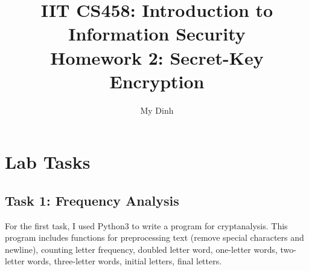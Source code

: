 \documentclass{article}
\title{IIT CS458: Introduction to Information Security\\
  {\large Homework 2: Secret-Key Encryption}}
\author{My Dinh}
\date{}
\begin{document}
\maketitle

\addtocounter{section}{1}

\section{Lab Tasks}

\subsection{Task 1: Frequency Analysis}

For the first task, I used Python3 to write a program for cryptanalysis. This
program includes functions for preprocessing text (remove special characters and newline),
counting letter frequency, doubled letter word, one-letter words, two-letter words,
three-letter words, initial letters, final letters.
\end{document}
